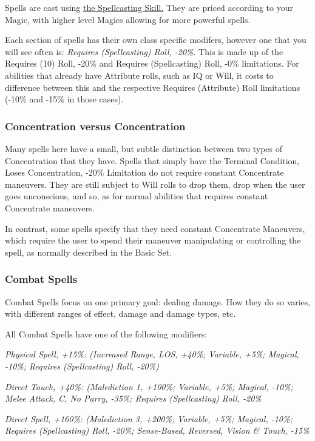\begin{multicols}{3}
	Spells are cast using \hyperref[spellcasting_skill]{the Spellcasting Skill.} They are priced according to your Magic, with higher level Magics allowing for more powerful spells.
	
	Each section of spells has their own class specific modifers, however one that you will see often is:	\textit{Requires (Spellcasting) Roll, -20\%}. This is made up of the Requires (10) Roll, -20\% and Requires (Spellcasting) Roll, -0\% limitations. For abilities that already have Attribute rolls, such as IQ or Will, it costs to difference between this and the respective Requires (Attribute) Roll limitations (-10\% and -15\% in those cases). 
	
	\subsubsection{Concentration versus Concentration}
	
	Many spells here have a small, but subtle distinction between two types of Concentration that they have. Spells that simply have the Terminal Condition, Loses Concentration, -20\% Limitation do not require constant Concentrate maneuvers. They are still subject to Will rolls to drop them, drop when the user goes unconscious, and so, as for normal abilities that requires constant Concentrate maneuvers.
	
	In contrast, some spells specify that they need constant Concentrate Maneuvers, which require the user to spend their maneuver manipulating or controlling the spell, as normally described in the Basic Set.
	
	\subsubsection{Combat Spells}
	
	Combat Spells focus on one primary goal: dealing damage. How they do so varies, with different ranges of effect, damage and damage types, etc.
	
	All Combat Spells have one of the following modifiers:
	
	\textcolor{OliveGreen}{\textit{Physical Spell, +15\%: (Increased Range, LOS, +40\%; Variable, +5\%; Magical, -10\%; Requires (Spellcasting) Roll, -20\%)}}
	
	\textcolor{OliveGreen}{\textit{Direct Touch, +40\%: (Malediction 1, +100\%; Variable, +5\%; Magical, -10\%; Melee Attack, C, No Parry, -35\%; Requires (Spellcasting) Roll, -20\%}}
	
	\textcolor{OliveGreen}{\textit{Direct Spell, +160\%: (Malediction 3, +200\%; Variable, +5\%; Magical, -10\%; Requires (Spellcasting) Roll, -20\%; Sense-Based, Reversed, Vision \& Touch, -15\%}}
	

\end{multicols}
